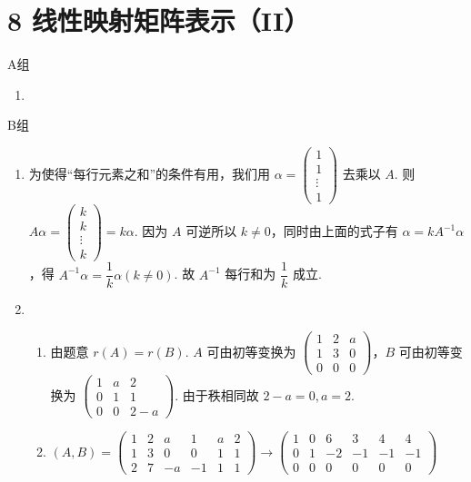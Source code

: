 \section*{8 线性映射矩阵表示（II）}

\vspace{2ex}

\centerline{\heiti A组}
\begin{enumerate}
    \item 
\end{enumerate}

\centerline{\heiti B组}
\begin{enumerate}
    \item 为使得“每行元素之和”的条件有用，我们用 $\alpha=\begin{pmatrix}1 \\ 1 \\ \vdots \\ 1\end{pmatrix}$ 去乘以 $A$. 则 $A\alpha=\begin{pmatrix}k \\ k \\ \vdots \\ k\end{pmatrix}=k\alpha$.
    因为 $A$ 可逆所以 $k\neq 0$，同时由上面的式子有 $\alpha=kA^{-1}\alpha$，得 $A^{-1}\alpha=\dfrac{1}{k}\alpha(k\neq 0)$.
    故 $A^{-1}$ 每行和为 $\dfrac{1}{k}$ 成立.
    \item \begin{enumerate}
        \item 由题意 $r(A)=r(B)$. $A$ 可由初等变换为 $\begin{pmatrix}1 & 2 & a \\ 1 & 3 & 0 \\ 0 & 0 & 0\end{pmatrix}$，$B$ 可由初等变换为 $\begin{pmatrix}1 & a & 2 \\ 0 & 1 & 1 \\ 0 & 0 & 2-a\end{pmatrix}$.
        由于秩相同故 $2-a=0,a=2$.
        \item $(A,B)=\begin{pmatrix}1 & 2 & a & 1 & a & 2 \\ 1 & 3 & 0 & 0 & 1 & 1 \\ 2 & 7 & -a & -1 & 1 & 1\end{pmatrix}\rightarrow\begin{pmatrix}1 & 0 & 6 & 3 & 4 & 4 \\ 0 & 1 & -2 & -1 & -1 & -1 \\ 0 & 0 & 0 & 0 & 0 & 0\end{pmatrix}$
        

\end{enumerate}
\end{enumerate}
